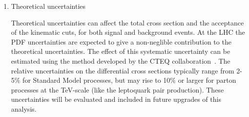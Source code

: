 \begin{enumerate}
\item Theoretical uncertainties 

Theoretical uncertainties can affect the total cross section and the acceptance of the kinematic cuts, for both signal 
and background events. 
At the LHC the PDF uncertainties are expected to give a non-neglible
contribution to the theoretical uncertainties.  
The effect of this systematic uncertainty can be estimated 
using the method developed by the CTEQ collaboration~\cite{PDFRescaling,CTEQreweighting}.
The relative uncertainties on the differential cross sections 
typically range from 2-5\% for Standard Model processes, 
but may rise to 10\% or larger for parton processes at the TeV-scale 
(like the leptoquark pair production).
These uncertainties will be evaluated and included in future upgrades of this analysis.
%
\end{enumerate}
%
%
